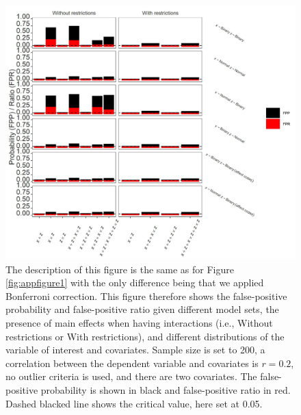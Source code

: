 \begin{figure}[ht!]
\includegraphics[width=1\textwidth]{R/Analysis/Result/Figures/Figure1ASIBon.jpeg}
\centering
\caption{The description of this figure is the same as for Figure \ref{fig:appfigure1} with the only difference being that we applied Bonferroni correction. This figure therefore shows the false-positive probability and false-positive ratio given different model sets, the presence of main effects when having interactions (i.e., Without restrictions or With restrictions), and different distributions of the variable of interest and covariates. Sample size is set to 200, a correlation between the dependent variable and covariates is $\textit{r}=0.2$, no outlier criteria is used, and there are two covariates. The false-positive probability is shown in black and false-positive ratio in red. Dashed blacked line shows the critical value, here set at 0.05. }
\label{fig:appfigure7}
\end{figure}

